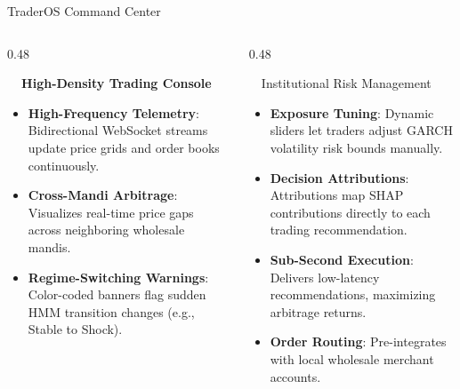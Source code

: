\documentclass{beamer}
\begin{document}
\begin{frame}{TraderOS Command Center}
\vspace{-0.2cm}

\begin{columns}[T]
    \begin{column}{0.48\textwidth}
        \begin{smallcard}[0.98\textwidth, top=3pt, bottom=3pt, left=4pt, right=4pt, boxsep=0.5pt]
            \centering \textbf{\textcolor{primaryDark}{\small {}~~High-Density Trading Console}}
            \vspace{0.08cm}
            \fontsize{6.8pt}{8.2pt}\selectfont
            \begin{itemize}\setlength\itemsep{4pt}\setlength\parskip{0pt}
                \item \textbf{High-Frequency Telemetry}: Bidirectional WebSocket streams update price grids and order books continuously.
                \item \textbf{Cross-Mandi Arbitrage}: Visualizes real-time price gaps across neighboring wholesale mandis.
                \item \textbf{Regime-Switching Warnings}: Color-coded banners flag sudden HMM transition changes (e.g., Stable to Shock).
            \end{itemize}
        \end{smallcard}
    \end{column}
    
    \begin{column}{0.48\textwidth}
        \begin{orangecard}[height=4.6cm]{~~Institutional Risk Management}
            \fontsize{6.8pt}{8.2pt}\selectfont
            \begin{itemize}\setlength\itemsep{3pt}\setlength\parskip{0pt}
                \item \textbf{Exposure Tuning}: Dynamic sliders let traders adjust GARCH volatility risk bounds manually.
                \item \textbf{Decision Attributions}: Attributions map SHAP contributions directly to each trading recommendation.
                \item \textbf{Sub-Second Execution}: Delivers low-latency recommendations, maximizing arbitrage returns.
                \item \textbf{Order Routing}: Pre-integrates with local wholesale merchant accounts.
            \end{itemize}
        \end{orangecard}
    \end{column}
\end{columns}


\end{frame}
\end{document}
